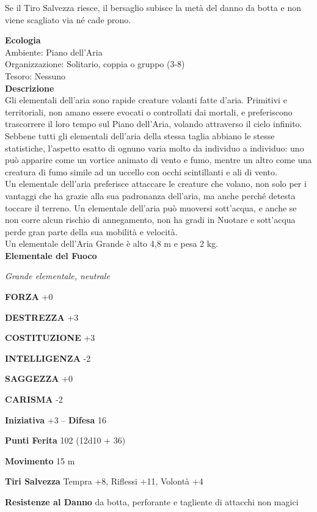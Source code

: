 \begin{multicols}{2}
Se il Tiro Salvezza riesce, il bersaglio subisce la metà del danno da botta e non viene scagliato via né cade prono.

\textbf{Ecologia}\\
Ambiente: Piano dell'Aria\\
Organizzazione: Solitario, coppia o gruppo (3-8)\\
Tesoro: Nessuno\\
\textbf{Descrizione}\\
Gli elementali dell'aria sono rapide creature volanti fatte d'aria. Primitivi e territoriali, non amano essere evocati o controllati dai mortali, e preferiscono trascorrere il loro tempo sul Piano dell'Aria, volando attraverso il cielo infinito.\\
Sebbene tutti gli elementali dell'aria della stessa taglia abbiano le stesse statistiche, l'aspetto esatto di ognuno varia molto da individuo a individuo: uno può apparire come un vortice animato di vento e fumo, mentre un altro come una creatura di fumo simile ad un uccello con occhi scintillanti e ali di vento.\\
Un elementale dell'aria preferisce attaccare le creature che volano, non solo per i vantaggi che ha grazie alla sua padronanza dell'aria, ma anche perché detesta toccare il terreno. Un elementale dell'aria può muoversi sott'acqua, e anche se non corre alcun rischio di annegamento, non ha gradi in Nuotare e sott'acqua perde gran parte della sua mobilità e velocità.\\
Un elementale dell'Aria Grande è alto 4,8 m e pesa 2 kg.\\


\medskip{}\textbf{Elementale del Fuoco}

\emph{Grande elementale, neutrale}

\textbf{FORZA} +0

\textbf{DESTREZZA} +3

\textbf{COSTITUZIONE} +3

\textbf{INTELLIGENZA} -2

\textbf{SAGGEZZA} +0

\textbf{CARISMA} -2

\textbf{Iniziativa} +3 -- \textbf{Difesa} 16

\textbf{Punti Ferita} 102 (12d10 + 36)

\textbf{Movimento} 15 m

\textbf{Tiri Salvezza} Tempra +8, Riflessi +11, Volontà +4

\textbf{Resistenze al Danno} da botta, perforante e tagliente di attacchi non magici


\end{multicols}
